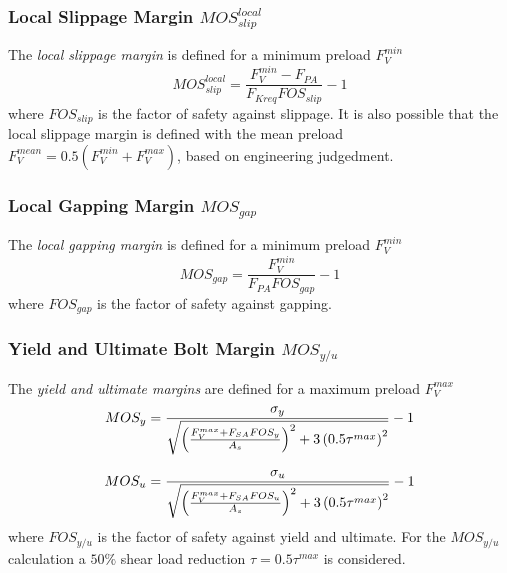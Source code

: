 \subsubsection{Local Slippage Margin $MOS_{slip}^{local}$}
The \emph{local slippage margin} is defined for a minimum preload $F_V^{min}$
\begin{equation}
  MOS_{slip}^{local} = \frac{F_V^{min}-F_{PA}}{F_{Kreq} FOS_{slip}}-1
\end{equation}
where $FOS_{slip}$ is the factor of safety against slippage. It is also possible that the local slippage 
margin is defined with the mean preload $F_V^{mean} = 0.5 (F_V^{min}+F_V^{max})$, based on engineering
judgedment. 
\subsubsection{Local Gapping Margin $MOS_{gap}$}
The \emph{local gapping margin} is defined for a minimum preload $F_V^{min}$
\begin{equation}
  MOS_{gap} = \frac{F_V^{min}}{F_{PA} FOS_{gap}}-1
\end{equation}
where $FOS_{gap}$ is the factor of safety against gapping. 
\subsubsection{Yield and Ultimate Bolt Margin $MOS_{y/u}$}
The \emph{yield and ultimate margins} are defined for a maximum preload $F_V^{max}$ 
\begin{subequations}
  \setlength{\jot}{10pt}
  \begin{align}
    MOS_{y} &= \frac{\sigma_y}{\sqrt{\left(\frac{F_V^{max}+F_{SA} FOS_y}{A_s}\right)^2 + 
      3\left(0.5 \tau^{max}\right)^2}}-1 \\
    MOS_{u} &= \frac{\sigma_u}{\sqrt{\left(\frac{F_V^{max}+F_{SA} FOS_u}{A_s}\right)^2 + 
      3\left(0.5 \tau^{max}\right)^2}}-1
  \end{align}
\end{subequations}
where $FOS_{y/u}$ is the factor of safety against yield and ultimate. For the $MOS_{y/u}$ calculation
a $50\%$ shear load reduction $\tau = 0.5 \tau^{max}$ is considered\footnotemark[2]
.